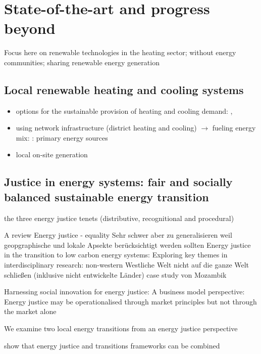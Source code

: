 \section{State-of-the-art and progress beyond}\label{stateoftheart}

Focus here on renewable technologies in the heating sector; without energy communities; sharing renewable energy generation

\subsection{Local renewable heating and cooling systems}
\begin{itemize}
	\item options for the sustainable provision of heating and cooling demand: \cite{seyboth2008recognising}, \cite{popovski2018technical}
	\item using network infrastructure (district heating and cooling) $\longrightarrow$ fueling energy mix: \cite{lake2017review}: primary energy sources
	\item local on-site generation
\end{itemize}

\subsection{Justice in energy systems: fair and socially balanced sustainable energy transition}
the three energy justice tenets (distributive, recognitional and procedural)


A review Energy justice - equality \cite{pellegrini2020energy}
Sehr schwer aber zu generalisieren weil geopgraphische und lokale Apsekte berücksichtigt werden sollten
Energy justice in the transition to low carbon energy systems: Exploring key themes in interdisciplinary research: non-western 
Westliche Welt nicht auf die ganze Welt schließen (inklusive nicht entwickelte Länder) \cite{broto2018energy} case study von Mozambik

Harnessing social innovation for energy justice: A business model perspective: Energy justice may be operationalised through market principles but not through the market alone \cite{hiteva2017harnessing}

We examine two local energy transitions from an energy justice perspective \cite{mundaca2018successful}

show that energy justice and transitions frameworks can be combined \cite{jenkins2018humanizing}

